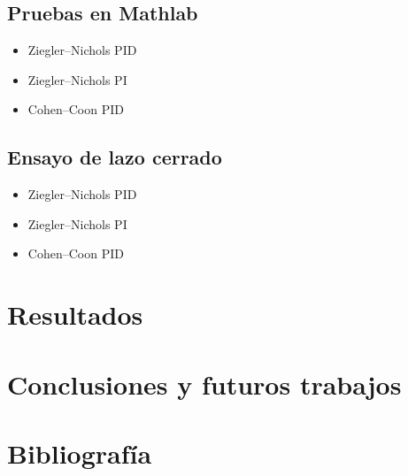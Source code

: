 \documentclass[11pt]{article}
\begin{document}
\subsection{Pruebas en Mathlab}
    \begin{itemize} 
        \item Ziegler–Nichols PID \\
        
        \item Ziegler–Nichols PI \\
        
        \item Cohen–Coon PID
    \end{itemize}
    
\subsection{Ensayo de lazo cerrado}
    \begin{itemize} 
        \item Ziegler–Nichols PID \\
        
        \item Ziegler–Nichols PI \\
        
        \item Cohen–Coon PID
    \end{itemize}


\section{Resultados}



\section{Conclusiones y futuros trabajos}



\section{Bibliografía}












\end{document}
